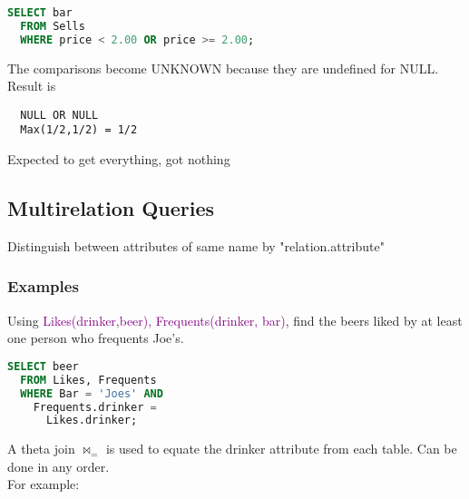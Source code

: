 \documentclass[12pt]{article}
\begin{document}
\begin{lstlisting}[language=SQL]
  SELECT bar
  FROM Sells
  WHERE price < 2.00 OR price >= 2.00;
\end{lstlisting}
The comparisons become UNKNOWN because they are undefined for NULL.\\
Result is 
\begin{verbatim}
  NULL OR NULL
  Max(1/2,1/2) = 1/2
\end{verbatim}
Expected to get everything, got nothing

\subsection{Multirelation Queries}
Distinguish between attributes of same name by 
"relation.attribute"

\subsubsection{Examples}
Using \textcolor{purple}{Likes(drinker,beer), Frequents(drinker, bar)},
find the beers liked by at least one person who frequents Joe's.
\begin{lstlisting}[language=SQL]
  SELECT beer
  FROM Likes, Frequents
  WHERE Bar = 'Joes' AND
    Frequents.drinker = 
      Likes.drinker;
\end{lstlisting}
A theta join $\Join_{=}$ is used to equate the drinker attribute from each table.
Can be done in any order.\\
For example:

\end{document}
